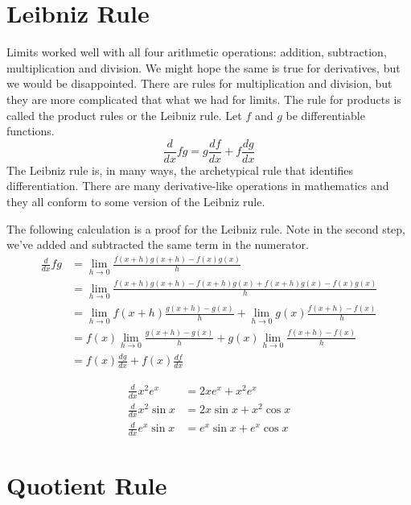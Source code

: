 \documentclass[fleqn]{report}
\begin{document}
\section*{Leibniz Rule}

Limits worked well with all four arithmetic operations:
addition, subtraction, multiplication and division. We might
hope the same is true for derivatives, but we would be
disappointed. There are rules for multiplication and division,
but they are more complicated that what we had for limits.
The rule for products is called the product rules or the
Leibniz rule. Let $f$ and $g$ be differentiable functions.
\begin{equation*}
\frac{d}{dx} fg = g \frac{df}{dx} + f \frac{dg}{dx} 
\end{equation*}
The Leibniz rule is, in many ways, the archetypical rule that
identifies differentiation. There are many derivative-like
operations in mathematics and they all conform to some version
of the Leibniz rule. 

The following calculation is a proof for the Leibniz rule.
Note in the second step, we've added and subtracted the same
term in the numerator.
\begin{align*}
\frac{d}{dx} fg & = \lim_{h \rightarrow 0} \frac{f(x+h)g(x+h) -
f(x)g(x)}{h} \\
& = \lim_{h \rightarrow 0} \frac{f(x+h)g(x+h) - f(x+h) g(x) +
f(x+h) g(x) - f(x)g(x)}{h} \\
& = \lim_{h \rightarrow 0} f(x+h)\frac{g(x+h) - g(x)}{h} +
\lim_{h \rightarrow 0} g(x) \frac{f(x+h) - f(x)}{h} \\
& = f(x) \lim_{h \rightarrow 0} \frac{g(x+h) - g(x)}{h} +
g(x) \lim_{h \rightarrow 0} \frac{f(x+h) - f(x)}{h} \\
& = f(x) \frac{dg}{dx} + f(x) \frac{df}{dx}
\end{align*}

\begin{example}
\begin{align*}
\frac{d}{dx} x^2 e^x & = 2x e^x + x^2 e^x \\
\frac{d}{dx} x^2 \sin x & = 2x \sin x + x^2 \cos x \\
\frac{d}{dx} e^x \sin x & = e^x \sin x + e^x \cos x 
\end{align*}
\end{example}

\section*{Quotient Rule}
\end{document}
